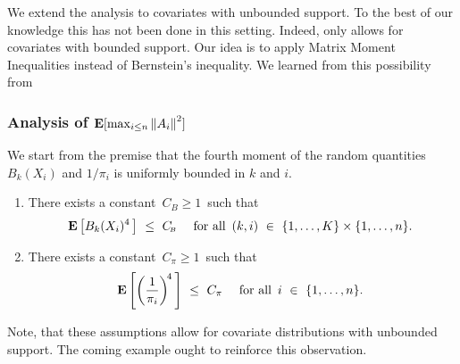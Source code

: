 We extend the analysis to covariates with unbounded support. To the best of our knowledge this has not been done in this setting.
Indeed, \cite[Assumption 1]{Wang2019} only allows for covariates with bounded support.
Our idea is to apply Matrix Moment Inequalities instead of Bernstein's inequality. We learned from this possibility from \cite[(6.1.6)]{Tropp2015}
\subsubsection*{
  Analysis of 
  $
  \mathbf{E}[\max_{i \le n}\left\lVert A_i\right\rVert^2]
  $
}
We start from the premise that the fourth moment of 
the random quantities $B_k(X_i)$ and $1/\pi_i$ is uniformly bounded 
in $k$ and $i$.
\begin{assumptions*}
  \begin{enumerate}[label={(\roman*)}]
    \item
  There exists 
  a constant 
  $
  \,
    C_{\!\scriptscriptstyle B}
  \ge
  1
  \,
  $ such that
  \begin{gather*}
  \E\left[
    B_k(X_i)^{4}
    \,
  \right]
  \ 
  \le
  \ 
    C_{\!\scriptscriptstyle B}
    \quad
    \text{
  for all $\,(k,i)\ \in\  \left\{ 1, \ldots, K \right\}\times \left\{ 1, \ldots, n \right\}$.
    }
  \end{gather*}
  \item
  There exists a constant $\,C_\pi \!\ge 1\,$ such that
  \begin{gather*}
  \E \left[ 
    \left(
      \frac{1}{\pi_{i}}
    \right)^{\!4}
    \,
  \right]
  \ 
  \le
  \ 
  C_\pi
  \quad
  \text{
  for all $\,i\ \in\  \left\{ 1, \ldots, n \right\}$.
  }
  \end{gather*}
  \end{enumerate}
\end{assumptions*}
Note, that these assumptions allow for covariate distributions with unbounded support. The coming example ought to reinforce this observation.
